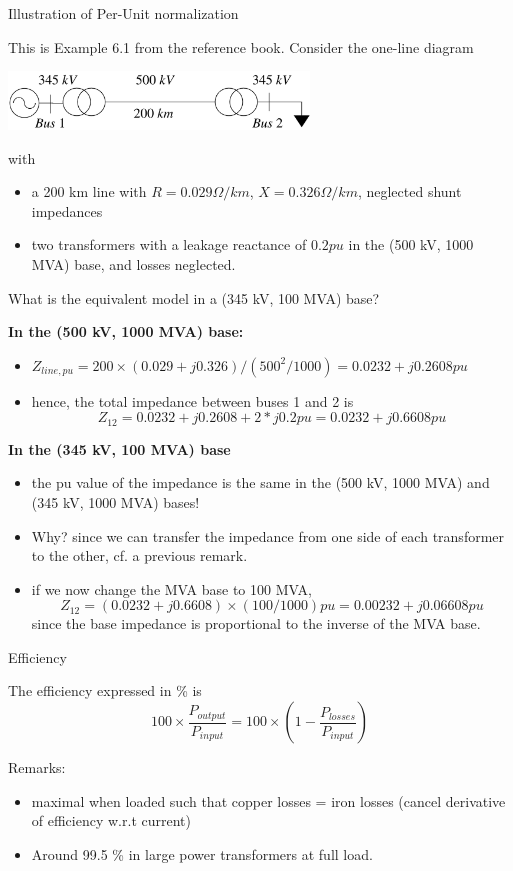 \begin{frame}[allowframebreaks]{Illustration of Per-Unit normalization}

This is Example 6.1 from the reference book. Consider the one-line diagram 
\begin{center}
    \includegraphics[width=0.6\textwidth]{images/example-6-1.png}
\end{center}
with 
\begin{itemize}
    \item a 200 km line with $R = 0.029 \Omega/km$, $X=0.326 \Omega/km$, neglected shunt impedances
    \item two transformers with a leakage reactance of $0.2 pu$ in the (500 kV, 1000 MVA) base, and losses neglected.
\end{itemize}
\alert{What is the equivalent model in a (345 kV, 100 MVA) base?}



\textbf{In the (500 kV, 1000 MVA) base:}
\begin{itemize}
    \item $Z_{line, pu} = 200 \times (0.029 + j 0.326) / (500^2/1000) = 0.0232 + j 0.2608 pu$
    \item hence, the total impedance between buses 1 and 2 is $$Z_{12} = 0.0232 + j 0.2608  + 2 * j 0.2pu =  0.0232 + j 0.6608 pu $$
\end{itemize}


\textbf{In the (345 kV, 100 MVA) base}
\begin{itemize}
    \item the pu value of the impedance is the same in the (\alert{500} kV, 1000 MVA) and (\alert{345} kV, 1000 MVA) bases! 
    \item Why? since we can transfer the impedance from one side of each transformer to the other, cf. a previous remark.
    \item if we now change the MVA base to 100 MVA, 
 $$Z_{12} = (0.0232 + j 0.6608)  \times (100/1000) pu =  0.00232 + j 0.06608 pu$$ since the base impedance is proportional to the inverse of the MVA base.
\end{itemize}
\end{frame}


\begin{frame}{Efficiency}

The efficiency expressed in \% is 
$$100 \times \frac{P_{output}}{P_{input}} = 100 \times \left(1 - \frac{P_{losses}}{P_{input}}\right) $$

Remarks: 
\begin{itemize}
    \item maximal when loaded such that copper losses = iron losses (cancel derivative of efficiency w.r.t current) 
    \item Around \alert{99.5 \%} in large power transformers at full load.
\end{itemize}
\end{frame}


